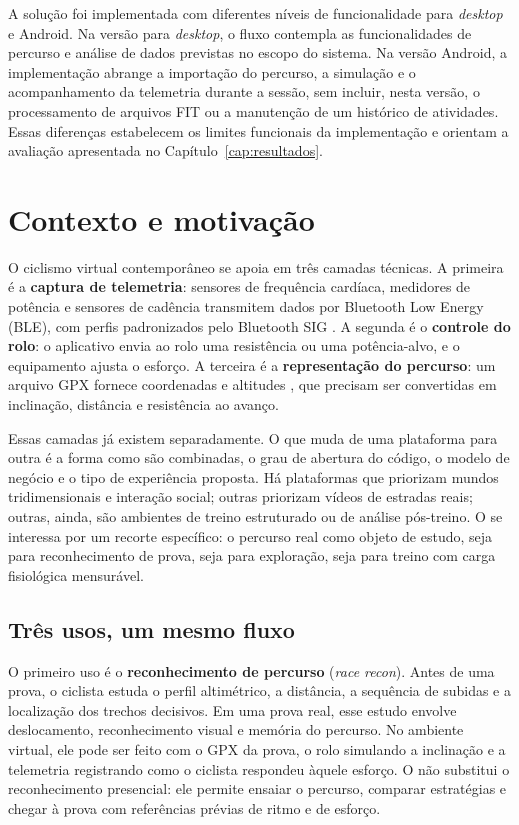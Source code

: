 A solução foi implementada com diferentes níveis de funcionalidade para
\textit{desktop} e Android. Na versão para \textit{desktop}, o fluxo contempla
as funcionalidades de percurso e análise de dados previstas no escopo do
sistema. Na versão Android, a implementação abrange a importação do percurso, a
simulação e o acompanhamento da telemetria durante a sessão, sem incluir, nesta
versão, o processamento de arquivos FIT ou a manutenção de um histórico de
atividades. Essas diferenças estabelecem os limites funcionais da implementação
e orientam a avaliação apresentada no Capítulo~\ref{cap:resultados}.

\section{Contexto e motivação}
\label{sec:contextualizacao}

O ciclismo virtual contemporâneo se apoia em três camadas técnicas. A primeira é
a \textbf{captura de telemetria}: sensores de frequência cardíaca, medidores de potência e
sensores de cadência transmitem dados por Bluetooth Low Energy (BLE), com
perfis padronizados pelo Bluetooth SIG \cite{bluetooth2017}. A segunda é o
\textbf{controle do rolo}: o aplicativo envia ao rolo uma resistência ou uma
potência-alvo, e o equipamento ajusta o esforço. A terceira é a
\textbf{representação do percurso}: um arquivo GPX fornece coordenadas e
altitudes \cite{gpx2004}, que precisam ser convertidas em inclinação, distância
e resistência ao avanço.

Essas camadas já existem separadamente. O que muda de uma plataforma para outra
é a forma como são combinadas, o grau de abertura do código, o modelo de
negócio e o tipo de experiência proposta. Há plataformas que priorizam mundos
tridimensionais e interação social; outras priorizam vídeos de estradas reais;
outras, ainda, são ambientes de treino estruturado ou de análise
pós-treino. O \argus{} se interessa por um recorte específico: o percurso real
como objeto de estudo, seja para reconhecimento de prova, seja para exploração,
seja para treino com carga fisiológica mensurável.

\subsection{Três usos, um mesmo fluxo}
\label{sec:tres-usos}

O primeiro uso é o \textbf{reconhecimento de percurso} (\textit{race recon}).
Antes de uma prova, o ciclista estuda o perfil altimétrico, a distância, a
sequência de subidas e a localização dos trechos decisivos. Em uma prova real,
esse estudo envolve deslocamento, reconhecimento visual e memória do percurso.
No ambiente virtual, ele pode ser feito com o GPX da prova, o rolo simulando
a inclinação e a telemetria registrando como o ciclista respondeu àquele
esforço. O \argus{} não substitui o reconhecimento presencial: ele permite
ensaiar o percurso, comparar estratégias e chegar à prova com referências
prévias de ritmo e de esforço.

